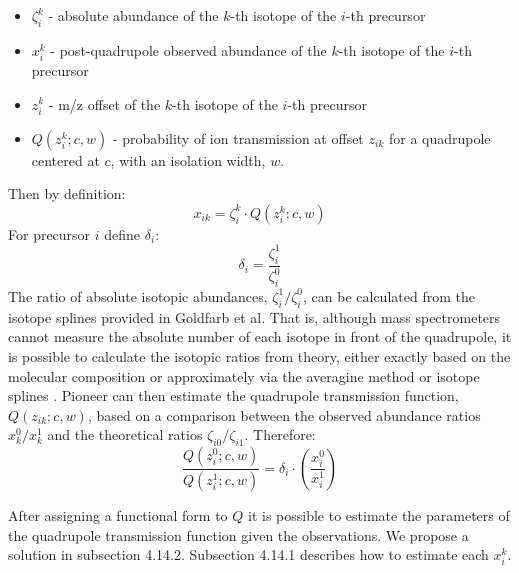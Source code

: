 \documentclass[pdflatex,sn-nature]{sn-jnl}
\begin{document}
\begin{itemize}
    \item $\zeta_{i}^{k}$ - absolute abundance of the $k$-th isotope of the $i$-th precursor
    \item $x_{i}^{k}$ - post-quadrupole observed abundance of the $k$-th isotope of the $i$-th precursor
    \item $z_{i}^{k}$ - m/z offset of the $k$-th isotope of the $i$-th precursor
    \item $Q(z_{i}^{k}; c, w)$ - probability of ion transmission at offset $z_{ik}$ for a quadrupole centered at $c$, with an isolation width, $w$.    
\end{itemize}
Then by definition:
\begin{equation}
    x_{ik} = \zeta_{i}^{k} \cdot Q(z_{i}^{k}; c, w)
\end{equation}
For precursor $i$ define $\delta_{i}$: 
\begin{equation}
    \delta_{i} = \frac{\zeta_{i}^{1}}{\zeta_{i}^{0}} 
\end{equation}
The ratio of absolute isotopic abundances, $\zeta_{i}^{1}/\zeta_{i}^{0}$, can be calculated from the isotope splines provided in Goldfarb et al. That is, although mass spectrometers cannot measure the absolute number of each isotope in front of the quadrupole, it is possible to calculate the isotopic ratios from theory, either exactly based on the molecular composition or approximately via the averagine method or isotope splines \cite{Goldfarb2018-ai}. Pioneer can then estimate the quadrupole transmission function, $Q(z_{ik}; c, w)$, based on a comparison between the observed abundance ratios $x_{k}^{0}/x_{k}^{1}$ and the theoretical ratios $\zeta_{i0}/\zeta_{i1}$. Therefore:
\begin{equation}
\frac{Q(z_{i}^{0}; c, w)}{Q(z_{i}^{1}; c, w)} = \delta_{i} \cdot \left(\frac{x_{i}^{0}}{x_{i}^{1}}\right)
\end{equation}

After assigning a functional form to $Q$ it is possible to estimate the parameters of the quadrupole transmission function given the observations. We propose a solution in subsection 4.14.2. Subsection 4.14.1 describes how to estimate each $x_{i}^{k}$.  



\end{document}
